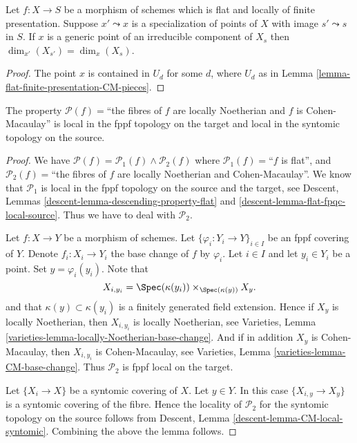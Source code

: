 \begin{lemma}
\label{lemma-flat-finite-presentation-specialization-dimension}
Let $f : X \to S$ be a morphism of schemes which is flat and locally
of finite presentation.
Suppose $x' \leadsto x$ is a specialization of points of $X$
with image $s' \leadsto s$ in $S$. If $x$ is a generic point of an
irreducible component of $X_s$ then $\dim_{x'}(X_{s'}) = \dim_x(X_s)$.
\end{lemma}

\begin{proof}
The point $x$ is contained in $U_d$ for some $d$, where $U_d$ as in
Lemma \ref{lemma-flat-finite-presentation-CM-pieces}.
\end{proof}

\begin{lemma}
\label{lemma-CM-local-source-and-target}
The property
$\mathcal{P}(f)=$``the fibres of $f$ are locally Noetherian and $f$ is
Cohen-Macaulay'' is local in the fppf topology on the target and
local in the syntomic topology on the source.
\end{lemma}

\begin{proof}
We have
$\mathcal{P}(f) =
\mathcal{P}_1(f) \wedge \mathcal{P}_2(f)$
where
$\mathcal{P}_1(f)=$``$f$ is flat'', and
$\mathcal{P}_2(f)=$``the fibres of $f$ are locally Noetherian
and Cohen-Macaulay''.
We know that $\mathcal{P}_1$ is
local in the fppf topology on the source and the target, see
Descent, Lemmas \ref{descent-lemma-descending-property-flat} and
\ref{descent-lemma-flat-fpqc-local-source}. Thus we have to deal
with $\mathcal{P}_2$.

\medskip\noindent
Let $f : X \to Y$ be a morphism of schemes.
Let $\{\varphi_i : Y_i \to Y\}_{i \in I}$ be an fppf covering of $Y$.
Denote $f_i : X_i \to Y_i$ the base change of $f$ by $\varphi_i$.
Let $i \in I$ and let $y_i \in Y_i$ be a point.
Set $y = \varphi_i(y_i)$. Note that
$$
X_{i, y_i} = \Spec(\kappa(y_i)) \times_{\Spec(\kappa(y))} X_y.
$$
and that $\kappa(y) \subset \kappa(y_i)$ is a finitely generated field
extension. Hence if $X_y$ is locally Noetherian, then
$X_{i, y_i}$ is locally Noetherian, see
Varieties, Lemma \ref{varieties-lemma-locally-Noetherian-base-change}.
And if in addition $X_y$ is Cohen-Macaulay,
then $X_{i, y_i}$ is Cohen-Macaulay, see
Varieties, Lemma \ref{varieties-lemma-CM-base-change}.
Thus $\mathcal{P}_2$ is fppf local on the target.

\medskip\noindent
Let $\{X_i \to X\}$ be a syntomic covering of $X$.
Let $y \in Y$. In this case $\{X_{i, y} \to X_y\}$ is a
syntomic covering of the fibre. Hence the locality of $\mathcal{P}_2$
for the syntomic topology on the source follows from
Descent, Lemma \ref{descent-lemma-CM-local-syntomic}.
Combining the above the lemma follows.
\end{proof}







